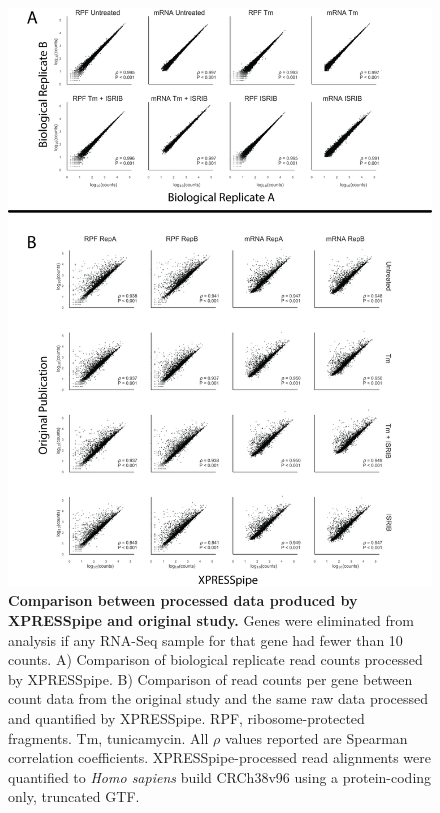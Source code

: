 \documentclass[10pt, oneside]{article}
\begin{document}
\begin{figure}
\centering
  \includegraphics[width=160mm]{figures/xpresspipe_figure2.png}
  \caption{\textbf{Comparison between processed data produced by XPRESSpipe and original study.} Genes were eliminated from analysis if any RNA-Seq sample for that gene had fewer than 10 counts. A) Comparison of biological replicate read counts processed by XPRESSpipe. B) Comparison of read counts per gene between count data from the original study and the same raw data processed and quantified by XPRESSpipe. RPF, ribosome-protected fragments. Tm, tunicamycin. All $\rho$ values reported are Spearman correlation coefficients. XPRESSpipe-processed read alignments were quantified to \textit{Homo sapiens} build CRCh38v96 using a protein-coding only, truncated GTF.}
  \label{fig:figure2}
\end{figure}
\end{document}
